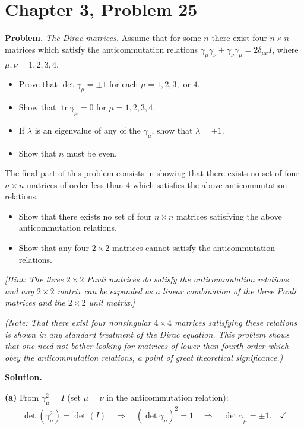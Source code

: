 \documentclass[12pt]{article}
\begin{document}
\section*{Chapter 3, Problem 25}

\textbf{Problem.} \textit{The Dirac matrices.} Assume that for some $n$ there exist four $n \times n$ matrices which satisfy the anticommutation relations $\gamma_\mu \gamma_\nu + \gamma_\nu \gamma_\mu = 2\delta_{\mu\nu}I$, where $\mu, \nu = 1, 2, 3, 4$.

\begin{itemize}
\item[(a)] Prove that $\det \gamma_\mu = \pm 1$ for each $\mu = 1, 2, 3, \text{ or } 4$.
\item[(b)] Show that $\operatorname{tr} \gamma_\mu = 0$ for $\mu = 1, 2, 3, 4$.
\item[(c)] If $\lambda$ is an eigenvalue of any of the $\gamma_\mu$, show that $\lambda = \pm 1$.
\item[(d)] Show that $n$ must be even.
\end{itemize}

The final part of this problem consists in showing that there exists no set of four $n \times n$ matrices of order less than 4 which satisfies the above anticommutation relations.

\begin{itemize}
\item[(e)] Show that there exists no set of four $n \times n$ matrices satisfying the above anticommutation relations.
\item[(f)] Show that any four $2 \times 2$ matrices cannot satisfy the anticommutation relations.
\end{itemize}
\textit{[Hint: The three $2\times 2$ Pauli matrices do satisfy the anticommutation relations, and any $2 \times 2$ matrix can be expanded as a linear combination of the three Pauli matrices and the $2 \times 2$ unit matrix.]}

\textit{(Note: That there exist four nonsingular $4 \times 4$ matrices satisfying these relations is shown in any standard treatment of the Dirac equation. This problem shows that one need not bother looking for matrices of lower than fourth order which obey the anticommutation relations, a point of great theoretical significance.)}

\bigskip
\textbf{Solution.}

\textbf{(a)} From $\gamma_\mu^2 = I$ (set $\mu = \nu$ in the anticommutation relation):
\[
\det(\gamma_\mu^2) = \det(I) \quad \Rightarrow \quad (\det \gamma_\mu)^2 = 1 \quad \Rightarrow \quad \det \gamma_\mu = \pm 1. \quad \checkmark
\]
\end{document}

